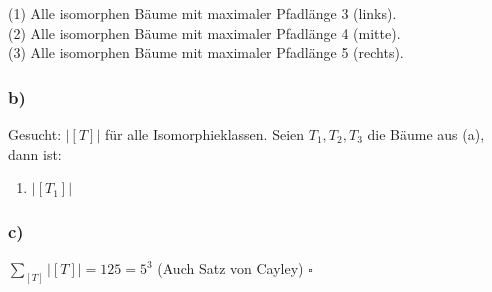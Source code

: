 \documentclass[11pt,a4paper,ngerman]{article}
\begin{document}
(1) Alle isomorphen Bäume mit maximaler Pfadlänge 3 (links).\\
(2) Alle isomorphen Bäume mit maximaler Pfadlänge 4 (mitte).\\
(3) Alle isomorphen Bäume mit maximaler Pfadlänge 5 (rechts).
\subsubsection*{b)}
Gesucht: $|[T]|$ für alle Isomorphieklassen.
Seien $T_1, T_2, T_3$ die Bäume aus (a), dann ist:
\begin{enumerate}
\item $|[T_1]|$ 
\end{enumerate}
\subsubsection*{c)}

$\sum_{[T]} |[T]| = 125 = 5^3$
(Auch Satz von Cayley)
\mbox{}\hfill$\square$

\label{LastPage}
\end{document}
